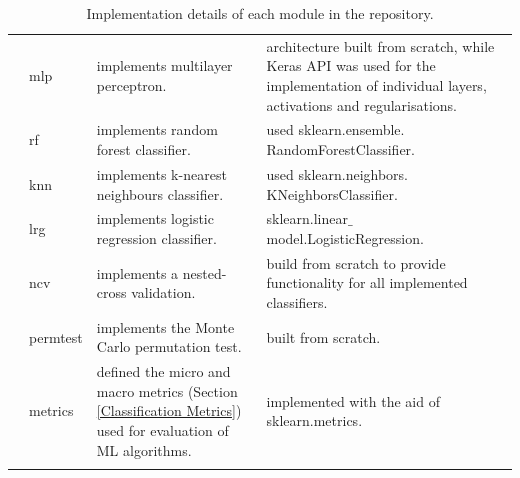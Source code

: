 \begin{longtable}{|p{}||p{}|p{}|p{}|}
                 & mlp                & implements multilayer perceptron.                                                                                & architecture built from scratch, while Keras API was used for the implementation of individual layers, activations and regularisations. \\
                  \cline{2-4}

                   & rf                 & implements random forest classifier.                                                                             & used   sklearn.ensemble. RandomForestClassifier.                                                                                                \\
                \cline{2-4}
                  & knn                & implements k-nearest neighbours classifier.                                                                      & used sklearn.neighbors. KNeighborsClassifier.                                                                                                   \\
                \cline{2-4}
                 & lrg                & implements logistic regression classifier.                                                                       & sklearn.linear$\_$model.LogisticRegression.                                                                                                     \\

\hline
\noalign{\vspace{6pt}}
\hline

  \multirow{3}{*}{(3)}            & ncv                & implements a nested-cross validation.                                                                            & build from scratch to provide functionality for all implemented classifiers.                                                                    \\
\cline{2-4}
                   & permtest           & implements the Monte Carlo permutation test.                                                                     & built from scratch.                                                                                                                            \\
\cline{2-4}
                  & metrics            & defined the micro and macro metrics (Section \ref{Classification Metrics}) used for evaluation of ML algorithms. & implemented with the aid of sklearn.metrics.                                                                                                    \\


  \hline
  \caption[Repository Overview]{Implementation details of each module in the repository.}
  \label{repo_overview}
\end{longtable} 


